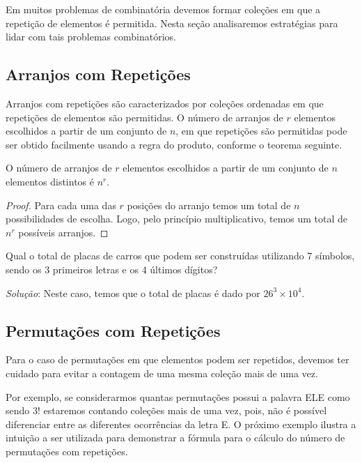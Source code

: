 Em muitos problemas de combinatória devemos formar coleções em que a
repetição de elementos é permitida. Nesta seção analisaremos
estratégias para lidar com tais problemas combinatórios.

\subsection{Arranjos com Repetições}

Arranjos com repetições são caracterizados por coleções ordenadas em
que repetições de elementos são permitidas. O número de arranjos de
$r$ elementos escolhidos a partir de um conjunto de $n$, em que
repetições são permitidas pode ser obtido facilmente usando a regra do
produto, conforme o teorema seguinte.

\begin{Theorem}
O número de arranjos de $r$ elementos escolhidos a partir
de um conjunto de $n$ elementos distintos é $n^r$.
\end{Theorem}
\begin{proof}
Para cada uma das $r$ posições do arranjo temos um total de $n$
possibilidades de escolha. Logo, pelo princípio multiplicativo, temos
um total de $n^r$ possíveis arranjos.
\end{proof}

\begin{Example}
Qual o total de placas de carros que podem ser construídas utilizando
7 símbolos, sendo os 3 primeiros letras e os 4 últimos dígitos?

\textit{Solução}: Neste caso, temos que o total de placas é dado por
$26^3 \times 10^4$.
\end{Example}

\subsection{Permutações com Repetições}

Para o caso de permutações em que elementos podem ser repetidos,
devemos ter cuidado para evitar a contagem de uma mesma coleção mais
de uma vez.

Por exemplo, se considerarmos quantas permutações possui a palavra ELE
como sendo $3!$ estaremos contando coleções mais de uma vez, pois, não
é possível diferenciar entre as diferentes ocorrências da letra E. O
próximo exemplo ilustra a intuição a ser utilizada para demonstrar a
fórmula para o cálculo do número de permutações com repetições.


